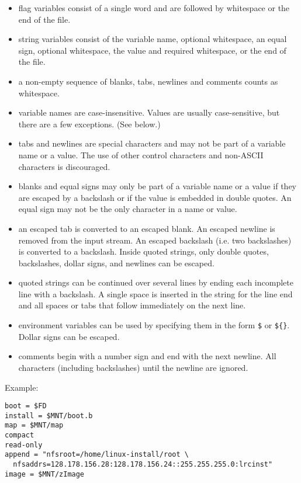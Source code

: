 \begin{itemize}
  \item flag variables consist of a single word and are followed by
    whitespace or the end of the file.
  \item string variables consist of the variable name, optional whitespace,
    an equal sign, optional whitespace, the value and required whitespace,
    or the end of the file.
  \item a non-empty sequence of blanks, tabs, newlines and comments counts
    as whitespace.
  \item variable names are case-insensitive. Values are usually case-sensitive,
    but there are a few exceptions. (See below.)
  \item tabs and newlines are special characters and may not be part of a
    variable name or a value. The use of other control characters and
    non-ASCII characters is discouraged.
  \item blanks and equal signs may only be part of a variable name or a
    value if they are escaped by a backslash or if the value is embedded in
    double quotes. An equal sign may not be the only character in a name or
    value.
  \item an escaped tab is converted to an escaped blank. An escaped newline
    is removed from the input stream. An escaped backslash (i.e. two
    backslashes) is converted to a backslash. Inside quoted strings, only
    double quotes, backslashes, dollar signs, and newlines can be escaped.
  \item quoted strings can be continued over several lines by ending each
    incomplete line with a backslash. A single space is inserted in the
    string for the line end and all spaces or tabs that follow immediately
    on the next line.
  \item environment variables can be used by specifying them in the form
    \verb"$" or \verb"${"\verb"}". Dollar signs can
    be escaped.
  \item comments begin with a number sign and end with the next newline.
    All characters (including backslashes) until the newline are ignored.
\end{itemize}

Example:
\begin{verbatim}
boot = $FD
install = $MNT/boot.b
map = $MNT/map
compact
read-only
append = "nfsroot=/home/linux-install/root \
  nfsaddrs=128.178.156.28:128.178.156.24::255.255.255.0:lrcinst"
image = $MNT/zImage
\end{verbatim}


